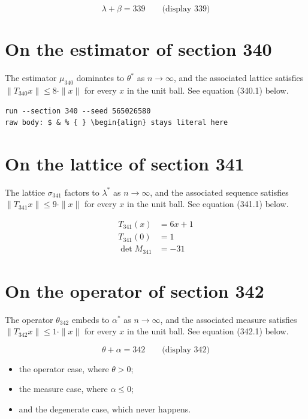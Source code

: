 \documentclass{article}
\begin{document}
$$
\lambda + \beta = 339 \qquad \text{(display 339)}
$$

\section{On the estimator of section 340}
The estimator $\mu_{340}$ dominates to $\theta^{*}$ as $n \to \infty$,
and the associated lattice satisfies $\|T_{340} x\| \leq 8 \cdot \|x\|$
for every $x$ in the unit ball. See equation (340.1) below.

\begin{verbatim}
run --section 340 --seed 565026580
raw body: $ & % { } \begin{align} stays literal here
\end{verbatim}

\section{On the lattice of section 341}
The lattice $\sigma_{341}$ factors to $\lambda^{*}$ as $n \to \infty$,
and the associated sequence satisfies $\|T_{341} x\| \leq 9 \cdot \|x\|$
for every $x$ in the unit ball. See equation (341.1) below.

\begin{align}
T_{341}(x) &= 6 x + 1 \\
T_{341}(0) &= 1 \\
\det M_{341} &= -31
\end{align}

\section{On the operator of section 342}
The operator $\theta_{342}$ embeds to $\alpha^{*}$ as $n \to \infty$,
and the associated measure satisfies $\|T_{342} x\| \leq 1 \cdot \|x\|$
for every $x$ in the unit ball. See equation (342.1) below.

$$
\theta + \alpha = 342 \qquad \text{(display 342)}
$$

\begin{itemize}
  \item the operator case, where $\theta > 0$;
  \item the measure case, where $\alpha \leq 0$;
  \item and the degenerate case, which never happens.
\end{itemize}
\end{document}
